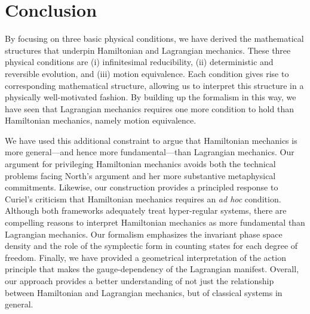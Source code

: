 \documentclass[12pt, twoside]{article}
\begin{document}


\section{Conclusion}
\label{conclusion}

By focusing on three basic physical conditions, we have derived the mathematical structures that underpin Hamiltonian and Lagrangian mechanics. These three physical conditions are (i) infinitesimal reducibility, (ii) deterministic and reversible evolution, and (iii) motion equivalence. Each condition gives rise to corresponding mathematical structure, allowing us to interpret this structure in a physically well-motivated fashion. By building up the formalism in this way, we have seen that Lagrangian mechanics requires one more condition to hold than Hamiltonian mechanics, namely motion equivalence.

We have used this additional constraint to argue that Hamiltonian mechanics is more general---and hence more fundamental---than Lagrangian mechanics. Our argument for privileging Hamiltonian mechanics avoids both the technical problems facing North's \parencites*[]{North} argument and her more substantive metaphysical commitments. Likewise, our construction provides a principled response to Curiel's \parencites*[]{Curiel} criticism that Hamiltonian mechanics requires an \textit{ad hoc} condition. Although both frameworks adequately treat hyper-regular systems, there are compelling reasons to interpret Hamiltonian mechanics as more fundamental than Lagrangian mechanics. Our formalism emphasizes the invariant phase space density and the role of the symplectic form in counting states for each degree of freedom. Finally, we have provided a geometrical interpretation of the action principle that makes the gauge-dependency of the Lagrangian manifest. Overall, our approach provides a better understanding of not just the relationship between Hamiltonian and Lagrangian mechanics, but of classical systems in general.
\end{document}
